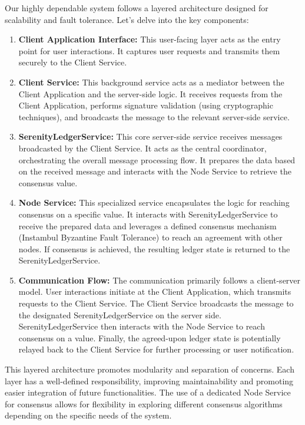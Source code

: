 Our highly dependable system follows a layered architecture designed for scalability and fault tolerance. Let's delve into the key components:

\begin{enumerate}
    \item \textbf{Client Application Interface:} This user-facing layer acts as the entry point for user interactions. It captures user requests and transmits them securely to the Client Service. 

    \item \textbf{Client Service:} This background service acts as a mediator between the Client Application and the server-side logic. It receives requests from the Client Application, performs signature validation (using cryptographic techniques), and broadcasts the message to the relevant server-side service.  

    \item \textbf{SerenityLedgerService:} This core server-side service receives messages broadcasted by the Client Service. It acts as the central coordinator, orchestrating the overall message processing flow. It prepares the data based on the received message and interacts with the Node Service to retrieve the consensus value.

    \item \textbf{Node Service:} This specialized service encapsulates the logic for reaching consensus on a specific value. It interacts with SerenityLedgerService to receive the prepared data and leverages a defined consensus mechanism (Instambul Byzantine Fault Tolerance) to reach an agreement with other nodes. If consensus is achieved, the resulting ledger state is returned to the SerenityLedgerService.

    \item \textbf{Communication Flow:}  The communication primarily follows a client-server model. User interactions initiate at the Client Application, which transmits requests to the Client Service. The Client Service broadcasts the message to the designated SerenityLedgerService on the server side. SerenityLedgerService then interacts with the Node Service to reach consensus on a value. Finally, the agreed-upon ledger state is potentially relayed back to the Client Service for further processing or user notification.
\end{enumerate}

This layered architecture promotes modularity and separation of concerns. Each layer has a well-defined responsibility, improving maintainability and promoting easier integration of future functionalities. The use of a dedicated Node Service for consensus allows for flexibility in exploring different consensus algorithms depending on the specific needs of the system.

